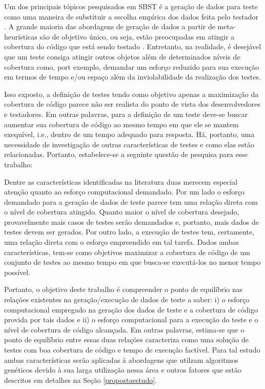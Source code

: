 Um dos principais tópicos pesquisados em SBST é a geração de dados para teste como uma maneira de substituir a escolha empírica dos dados feita pelo testador \cite{mcminn2004search}. A grande maioria das abordagens de geração de dados a partir de meta-heurísticas são de objetivo único, ou seja, estão preocupadas em atingir a cobertura do código que está sendo testado \cite{harman2015achievements}. Entretanto, na realidade, é desejável que um teste consiga atingir outros objetos além de determinados níveis de cobertura como, port exemplo, demandar um esforço reduzido para sua execução em termos de tempo e/ou espaço além da inviolabilidade da realização dos testes\cite{harman2015achievements}.

Isso exposto, a definição de testes tendo como objetivo apenas a maximização da cobertura de código parece não ser realista do ponto de vista dos desenvolvedores e testadores. Em outras palavras, para a definição de um teste deve-se buscar aumentar sua cobertura de código ao mesmo tempo em que ele se mantem exequível, i.e., dentro de um tempo adequado para resposta. Há, portanto, uma necessidade de investigação de outras características de testes e como elas estão relacionadas. Portanto, estabelece-se a seguinte questão de pesquisa para esse trabalho:


Dentre as características identificadas na literatura duas merecem especial atenção quanto ao esforço computacional demandado. Por um lado o esforço demandado para a geração de dados de teste parece tem uma relação direta com o nível de cobertura atingido. Quanto maior o nível de cobertura desejado, provavelmente mais casos de testes serão demandados e, portanto, mais dados de testes devem ser gerados. Por outro lado, a execução de testes tem, certamente, uma relação direta com o esforço empreendido em tal tarefa. Dados ambas características, tem-se como objetivos maximizar a cobertura de código de um conjunto de testes ao mesmo tempo em que busca-se executá-los no menor tempo possível.

Portanto, o objetivo deste trabalho é compreender o ponto de equilíbrio nas relações existentes na geração/execução de dados de teste a saber: i) o esforço computacional empregado na geração dos dados de teste e a cobertura de código provida por tais dados e ii) o esforço computacional para a execução do teste e o nível de cobertura de código alcançada. Em outras palavras, estima-se que o ponto de equilíbrio entre essas duas relações caracteriza como uma solução de testes com boa cobertura de código e tempo de execução factível. Para tal estudo ambas características serão aplicadas à abordagens que utilzam algoritmos genéticos devido à sua larga utilização nessa área e outros fatores que estão  descritos em detalhes na Seção \ref{propostaestudo}.

